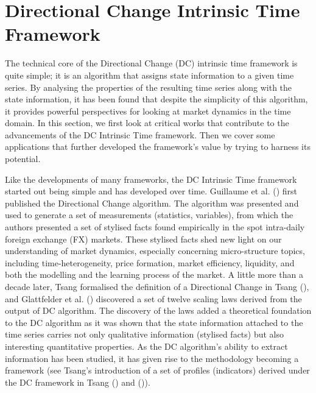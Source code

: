 \section{Directional Change Intrinsic Time Framework}\label{sec: dc}

The technical core of the Directional Change (DC) intrinsic time framework is quite simple; it is an algorithm that assigns state information to a given time series. By analysing the properties of the resulting time series along with the state information, it has been found that despite the simplicity of this algorithm, it provides powerful perspectives for looking at market dynamics in the time domain. In this section, we first look at critical works that contribute to the advancements of the DC Intrinsic Time framework. Then we cover some applications that further developed the framework's value by trying to harness its potential.

Like the developments of many frameworks, the DC Intrinsic Time framework started out being simple and has developed over time. Guillaume et al. (\citeyear{guillaume1997bird}) first published the Directional Change algorithm. The algorithm was presented and used to generate a set of measurements (statistics, variables), from which the authors presented a set of stylised facts found empirically in the spot intra-daily foreign exchange (FX) markets. These stylised facts shed new light on our understanding of market dynamics, especially concerning micro-structure topics, including time-heterogeneity, price formation, market efficiency, liquidity, and both the modelling and the learning process of the market. A little more than a decade later, Tsang formalised the definition of a Directional Change in Tsang (\citeyear{tsang2010directional}), and Glattfelder et al. (\citeyear{glattfelder2011patterns}) discovered a set of twelve scaling laws derived from the output of DC algorithm. The discovery of the laws added a theoretical foundation to the DC algorithm as it was shown that the state information attached to the time series carries not only qualitative information (stylised facts) but also interesting quantitative properties. As the DC algorithm's ability to extract information has been studied, it has given rise to the methodology becoming a framework (see Tsang's introduction of a set of profiles (indicators) derived under the DC framework in Tsang (\citeyear{tsang2015profiling}) and (\citeyear{tsang2017profiling})).

